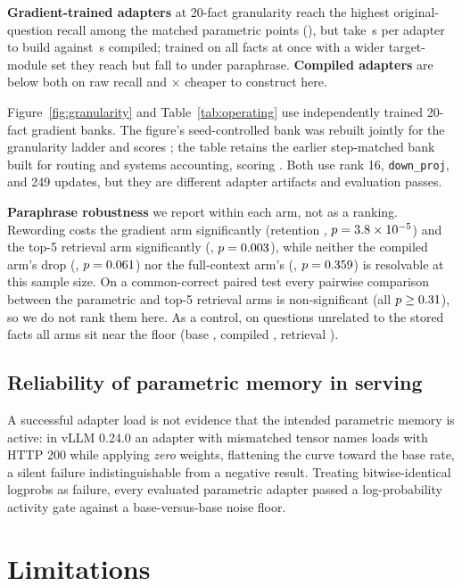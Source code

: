 \documentclass{article}
\begin{document}
\textbf{Gradient-trained adapters} at 20-fact granularity reach the highest
original-question recall among the matched parametric points (\SgdQ{}), but take
\SgdBuildPer{}\,s per adapter to build against \DtwoLBuildPer{}\,s
compiled; trained on all \NPerArm{} facts at once with a wider target-module set
they reach \SgdFullQ{} but fall to \SgdFullPQ{} under paraphrase.
\textbf{Compiled adapters} are below both on raw recall and \BuildRatio{}$\times$
cheaper to construct here.

Figure~\ref{fig:granularity} and Table~\ref{tab:operating} use independently
trained 20-fact gradient banks. The figure's seed-controlled bank was rebuilt
jointly for the granularity ladder and scores \SeedGTwentyQ{}; the table retains
the earlier step-matched bank built for routing and systems accounting, scoring
\SgdQ{}. Both use rank 16, \texttt{down\_proj}, and 249 updates, but they are
different adapter artifacts and evaluation passes.

\textbf{Paraphrase robustness} we report within each arm, not as a ranking.
Rewording costs the gradient arm significantly (retention \SgdRet{},
$p=3.8\times10^{-5}{}$) and the top-5 retrieval arm significantly (\RetrRet{},
$p=0.003{}$), while neither the compiled arm's drop (\GTwentyRet{},
$p=0.061{}$) nor the full-context arm's (\FullCtxRet{},
$p=0.359{}$) is resolvable at this sample size. On a common-correct paired
test every pairwise comparison between the parametric and top-5 retrieval arms is
non-significant (all $p\ge0.31{}$), so we do not rank them here. As a control,
on questions unrelated to the stored facts all arms sit near the floor (base
\NearBase{}, compiled \NearGTwenty{}, retrieval \NearRetr{}).

\subsection{Reliability of parametric memory in serving}
\label{sec:reliability}

A successful adapter load is not evidence that the intended parametric memory is
active: in vLLM 0.24.0 an adapter with mismatched tensor names loads with HTTP
200 while applying \emph{zero} weights, flattening the curve toward the base
rate, a silent failure indistinguishable from a negative result. Treating
bitwise-identical logprobs as failure, every evaluated parametric adapter passed
a log-probability activity gate against a base-versus-base noise floor.

\section{Limitations}
\label{sec:limits}
\end{document}
